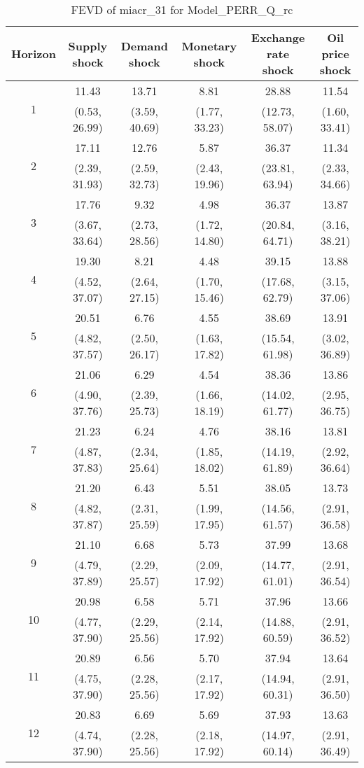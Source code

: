\documentclass{article}
\begin{document}
\begin{table}
	\footnotesize
	\caption{FEVD of miacr_31 for Model_PERR_Q_rc}
	\begin{tabular}{cccccc}
		Horizon & Supply shock & Demand shock & Monetary shock & Exchange rate shock & Oil price shock\\ \hline
		\multirow{2}{*}{1} & 11.43 & 13.71 & 8.81 & 28.88 & 11.54\\
		 & (0.53, 26.99) & (3.59, 40.69) & (1.77, 33.23) & (12.73, 58.07) & (1.60, 33.41)\\
		\multirow{2}{*}{2} & 17.11 & 12.76 & 5.87 & 36.37 & 11.34\\
		 & (2.39, 31.93) & (2.59, 32.73) & (2.43, 19.96) & (23.81, 63.94) & (2.33, 34.66)\\
		\multirow{2}{*}{3} & 17.76 & 9.32 & 4.98 & 36.37 & 13.87\\
		 & (3.67, 33.64) & (2.73, 28.56) & (1.72, 14.80) & (20.84, 64.71) & (3.16, 38.21)\\
		\multirow{2}{*}{4} & 19.30 & 8.21 & 4.48 & 39.15 & 13.88\\
		 & (4.52, 37.07) & (2.64, 27.15) & (1.70, 15.46) & (17.68, 62.79) & (3.15, 37.06)\\
		\multirow{2}{*}{5} & 20.51 & 6.76 & 4.55 & 38.69 & 13.91\\
		 & (4.82, 37.57) & (2.50, 26.17) & (1.63, 17.82) & (15.54, 61.98) & (3.02, 36.89)\\
		\multirow{2}{*}{6} & 21.06 & 6.29 & 4.54 & 38.36 & 13.86\\
		 & (4.90, 37.76) & (2.39, 25.73) & (1.66, 18.19) & (14.02, 61.77) & (2.95, 36.75)\\
		\multirow{2}{*}{7} & 21.23 & 6.24 & 4.76 & 38.16 & 13.81\\
		 & (4.87, 37.83) & (2.34, 25.64) & (1.85, 18.02) & (14.19, 61.89) & (2.92, 36.64)\\
		\multirow{2}{*}{8} & 21.20 & 6.43 & 5.51 & 38.05 & 13.73\\
		 & (4.82, 37.87) & (2.31, 25.59) & (1.99, 17.95) & (14.56, 61.57) & (2.91, 36.58)\\
		\multirow{2}{*}{9} & 21.10 & 6.68 & 5.73 & 37.99 & 13.68\\
		 & (4.79, 37.89) & (2.29, 25.57) & (2.09, 17.92) & (14.77, 61.01) & (2.91, 36.54)\\
		\multirow{2}{*}{10} & 20.98 & 6.58 & 5.71 & 37.96 & 13.66\\
		 & (4.77, 37.90) & (2.29, 25.56) & (2.14, 17.92) & (14.88, 60.59) & (2.91, 36.52)\\
		\multirow{2}{*}{11} & 20.89 & 6.56 & 5.70 & 37.94 & 13.64\\
		 & (4.75, 37.90) & (2.28, 25.56) & (2.17, 17.92) & (14.94, 60.31) & (2.91, 36.50)\\
		\multirow{2}{*}{12} & 20.83 & 6.69 & 5.69 & 37.93 & 13.63\\
		 & (4.74, 37.90) & (2.28, 25.56) & (2.18, 17.92) & (14.97, 60.14) & (2.91, 36.49)\\
	\end{tabular}
\label{tab:fevd-Model_PERR_Q_rc-miacr_31}
\end{table}
\end{document}
